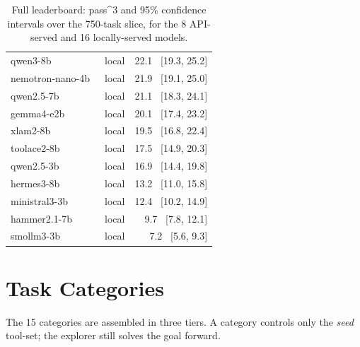 \begin{table}[t]
\begin{tabular}{llr}
    qwen3-8b~\cite{qwen3technicalreport} & local & 22.1 \, [19.3, 25.2] \\
    nemotron-nano-4b~\cite{parmar2024nemotron415btechnicalreport} & local & 21.9 \, [19.1, 25.0] \\
    qwen2.5-7b~\cite{qwen2025qwen25technicalreport} & local & 21.1 \, [18.3, 24.1] \\
    gemma4-e2b~\cite{gemma4google} & local & 20.1 \, [17.4, 23.2] \\
    xlam2-8b~\cite{zhang2024xlamfamilylargeaction} & local & 19.5 \, [16.8, 22.4] \\
    toolace2-8b~\cite{liu2025toolacewinningpointsllm} & local & 17.5 \, [14.9, 20.3] \\
    qwen2.5-3b~\cite{qwen2025qwen25technicalreport} & local & 16.9 \, [14.4, 19.8] \\
    hermes3-8b~\cite{teknium2024hermes3technicalreport} & local & 13.2 \, [11.0, 15.8] \\
    ministral3-3b~\cite{liu2026ministral3} & local & 12.4 \, [10.2, 14.9] \\
    hammer2.1-7b~\cite{lin2024hammerrobustfunctioncallingondevice} & local & 9.7 \, [7.8, 12.1] \\
    smollm3-3b~\cite{bakouch2025smollm3} & local & 7.2 \, [5.6, 9.3] \\
    \bottomrule
  \end{tabular}
  \caption{Full leaderboard: pass\textasciicircum{}3 and 95\% confidence
    intervals over the 750-task slice, for the 8 API-served and 16
    locally-served models.}
  \label{tab:leaderboard}
\end{table}

\section{Task Categories}
\label{app:categories}
The 15 categories are assembled in three tiers. A category controls only the
\emph{seed} tool-set; the explorer still solves the goal forward.

